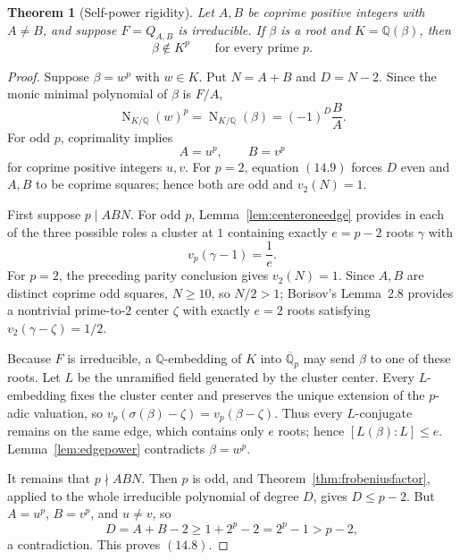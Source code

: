 \documentclass[11pt]{article}
\newtheorem{theorem}{Theorem}[section]
\theoremstyle{definition}
\newcommand{\Q}{\mathbb Q}
\begin{document}
\begin{theorem}[Self-power rigidity]\label{thm:selfpower}
Let \(A,B\) be coprime positive integers with \(A\neq B\), and suppose
\(F=Q_{A,B}\) is irreducible.  If \(\beta\) is a root and
\(K=\Q(\beta)\), then
\begin{equation}
 \beta\notin K^p
 \qquad\text{for every prime }p.
 \tag{14.8}
\end{equation}
\end{theorem}

\begin{proof}
Suppose \(\beta=w^p\) with \(w\in K\).  Put \(N=A+B\) and
\(D=N-2\).  Since the monic minimal polynomial of \(\beta\) is \(F/A\),
\begin{equation}
 \operatorname N_{K/\Q}(w)^p
 =\operatorname N_{K/\Q}(\beta)
 =(-1)^D\frac BA.
 \tag{14.9}
\end{equation}
For odd \(p\), coprimality implies
\[
 A=u^p,\qquad B=v^p
\]
for coprime positive integers \(u,v\).  For \(p=2\), equation \((14.9)\)
forces \(D\) even and \(A,B\) to be coprime squares; hence both are odd and
\(v_2(N)=1\).

First suppose \(p\mid ABN\).  For odd \(p\),
Lemma~\ref{lem:centeroneedge} provides in each of the three possible roles a
cluster at \(1\) containing exactly \(e=p-2\) roots
\(\gamma\) with
\[
 v_p(\gamma-1)=\frac1e.
\]
For \(p=2\), the preceding parity conclusion gives \(v_2(N)=1\).  Since
\(A,B\) are distinct coprime odd squares, \(N\geq10\), so \(N/2>1\);
Borisov's Lemma~2.8 provides a nontrivial prime-to-\(2\) center \(\zeta\)
with exactly \(e=2\) roots satisfying
\(v_2(\gamma-\zeta)=1/2\).

Because \(F\) is irreducible, a \(\Q\)-embedding of \(K\) into
\(\overline{\Q}_p\) may send \(\beta\) to one of these roots.  Let \(L\)
be the unramified field generated by the cluster center.  Every \(L\)-embedding fixes the cluster center and preserves the unique
extension of the \(p\)-adic valuation, so
\(v_p(\sigma(\beta)-\zeta)=v_p(\beta-\zeta)\).  Thus every
\(L\)-conjugate remains on the same edge, which contains only \(e\) roots;
hence \([L(\beta):L]\leq e\).  Lemma~\ref{lem:edgepower} contradicts
\(\beta=w^p\).

It remains that \(p\nmid ABN\).  Then \(p\) is odd, and
Theorem~\ref{thm:frobeniusfactor}, applied to the whole irreducible polynomial
of degree \(D\), gives \(D\leq p-2\).  But \(A=u^p\), \(B=v^p\), and
\(u\neq v\), so
\[
 D=A+B-2\geq1+2^p-2=2^p-1>p-2,
\]
a contradiction.  This proves \((14.8)\).
\end{proof}
\end{document}
